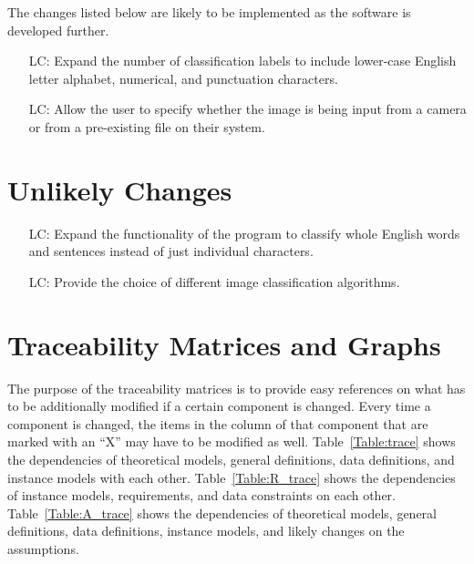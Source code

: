 \documentclass[12pt]{article}
\newcounter{lcnum} %
\begin{document}
The changes listed below are likely to be implemented as the software is developed further.

\noindent \begin{itemize}

\item[LC\refstepcounter{lcnum}\thelcnum\label{LC_meaningfulLabel}:] Expand the number of classification labels
to include lower-case English letter alphabet, numerical, and punctuation characters. 
\item[LC\refstepcounter{lcnum}\thelcnum\label{LC_meaningfulLabel}:] Allow the user to specify whether the image is being
input from a camera or from a pre-existing file on their system.

\end{itemize}

\section{Unlikely Changes}    

\noindent \begin{itemize}

\item[LC\refstepcounter{lcnum}\thelcnum\label{LC_meaningfulLabel}:] Expand the functionality of the program to classify
whole English words and sentences instead of just individual characters.
\item[LC\refstepcounter{lcnum}\thelcnum\label{LC_meaningfulLabel}:] Provide the choice of different image classification algorithms.


\end{itemize}

\section{Traceability Matrices and Graphs}

The purpose of the traceability matrices is to provide easy references on what
has to be additionally modified if a certain component is changed.  Every time a
component is changed, the items in the column of that component that are marked
with an ``X'' may have to be modified as well.  Table~\ref{Table:trace} shows the
dependencies of theoretical models, general definitions, data definitions, and
instance models with each other. Table~\ref{Table:R_trace} shows the
dependencies of instance models, requirements, and data constraints on each
other. Table~\ref{Table:A_trace} shows the dependencies of theoretical models,
general definitions, data definitions, instance models, and likely changes on
the assumptions.
\end{document}
